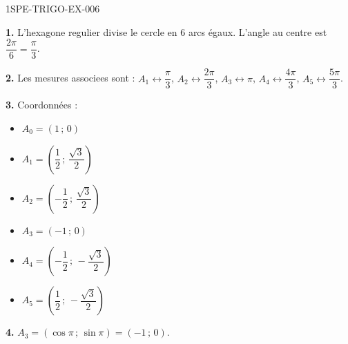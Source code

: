 \begin{corrige}{1SPE-TRIGO-EX-006}

\textbf{1.} L'hexagone regulier divise le cercle en $6$ arcs égaux. L'angle au centre est $\dfrac{2\pi}{6} = \dfrac{\pi}{3}$.

\textbf{2.} Les mesures associees sont : $A_1 \leftrightarrow \dfrac{\pi}{3}$, $A_2 \leftrightarrow \dfrac{2\pi}{3}$, $A_3 \leftrightarrow \pi$, $A_4 \leftrightarrow \dfrac{4\pi}{3}$, $A_5 \leftrightarrow \dfrac{5\pi}{3}$.

\textbf{3.} Coordonnées :
\begin{itemize}
  \item $A_0 = (1\,;\,0)$
  \item $A_1 = \left(\dfrac{1}{2}\,;\,\dfrac{\sqrt{3}}{2}\right)$
  \item $A_2 = \left(-\dfrac{1}{2}\,;\,\dfrac{\sqrt{3}}{2}\right)$
  \item $A_3 = (-1\,;\,0)$
  \item $A_4 = \left(-\dfrac{1}{2}\,;\,-\dfrac{\sqrt{3}}{2}\right)$
  \item $A_5 = \left(\dfrac{1}{2}\,;\,-\dfrac{\sqrt{3}}{2}\right)$
\end{itemize}

\textbf{4.} $A_3 = (\cos\pi\,;\,\sin\pi) = (-1\,;\,0)$. \checkmark

\end{corrige}
